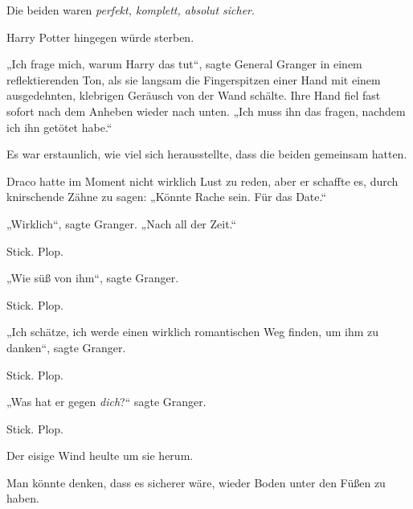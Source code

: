 Die beiden waren \emph{perfekt, komplett, absolut sicher}.

Harry Potter hingegen würde sterben.

„Ich frage mich, warum Harry das tut“, sagte General Granger in einem reflektierenden Ton, als sie langsam die Fingerspitzen einer Hand mit einem ausgedehnten, klebrigen Geräusch von der Wand schälte. Ihre Hand fiel fast sofort nach dem Anheben wieder nach unten.
„Ich muss ihn das fragen, nachdem ich ihn getötet habe.“

Es war erstaunlich, wie viel sich herausstellte, dass die beiden gemeinsam hatten.

Draco hatte im Moment nicht wirklich Lust zu reden, aber er schaffte es, durch knirschende Zähne zu sagen:
„Könnte Rache sein. Für das Date.“

„Wirklich“, sagte Granger.
„Nach all der Zeit.“

Stick. Plop.

„Wie süß von ihm“, sagte Granger.

Stick. Plop.

„Ich schätze, ich werde einen wirklich romantischen Weg finden, um ihm zu danken“, sagte Granger.

Stick. Plop.

„Was hat er gegen \emph{dich}?“ sagte Granger.

Stick. Plop.

Der eisige Wind heulte um sie herum.

\later

Man könnte denken, dass es sicherer wäre, wieder Boden unter den Füßen zu haben.

